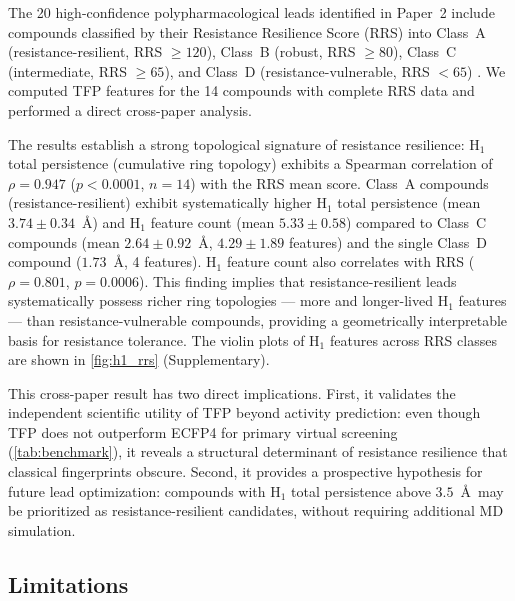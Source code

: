 \documentclass[11pt,a4paper]{article}
\begin{document}
The 20 high-confidence polypharmacological leads identified in Paper~2 include compounds classified by their Resistance Resilience Score (RRS) into Class~A (resistance-resilient, RRS $\geq 120$), Class~B (robust, RRS $\geq 80$), Class~C (intermediate, RRS $\geq 65$), and Class~D (resistance-vulnerable, RRS $< 65$) \citep{temgoua2026antimalarial}. We computed TFP features for the 14 compounds with complete RRS data and performed a direct cross-paper analysis.

The results establish a strong topological signature of resistance resilience: H$_1$ total persistence (cumulative ring topology) exhibits a Spearman correlation of $\rho = 0.947$ ($p < 0.0001$, $n=14$) with the RRS mean score. Class~A compounds (resistance-resilient) exhibit systematically higher H$_1$ total persistence (mean $3.74 \pm 0.34$~\AA) and H$_1$ feature count (mean $5.33 \pm 0.58$) compared to Class~C compounds (mean $2.64 \pm 0.92$~\AA, $4.29 \pm 1.89$ features) and the single Class~D compound ($1.73$~\AA, 4 features). H$_1$ feature count also correlates with RRS ($\rho = 0.801$, $p = 0.0006$). This finding implies that resistance-resilient leads systematically possess richer ring topologies --- more and longer-lived H$_1$ features --- than resistance-vulnerable compounds, providing a geometrically interpretable basis for resistance tolerance. The violin plots of H$_1$ features across RRS classes are shown in \cref{fig:h1_rrs} (Supplementary).

This cross-paper result has two direct implications. First, it validates the independent scientific utility of TFP beyond activity prediction: even though TFP does not outperform ECFP4 for primary virtual screening (\cref{tab:benchmark}), it reveals a structural determinant of resistance resilience that classical fingerprints obscure. Second, it provides a prospective hypothesis for future lead optimization: compounds with H$_1$ total persistence above $3.5$~\AA\ may be prioritized as resistance-resilient candidates, without requiring additional MD simulation.

\subsection{Limitations}
\end{document}
